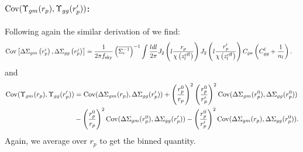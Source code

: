 \documentclass[onecolumn,amsmath,aps,fleqn, superscriptaddress]{revtex4}
\begin{document}
\paragraph*{${\rm Cov}(\Upsilon_{gm}(r_p),\Upsilon_{gg}(r_p^\prime))$:} Following again the similar derivation of \cite{Singh2016} we find:
\begin{align}
{\rm Cov}&\left[\Delta \Sigma_{gm}\left(r_p^i\right),\Delta \Sigma_{gg}\left(r_p^j\right) \right] = \frac{1}{2\pi f_{ \rm sky}}\left(\overline{\Sigma_c^{-1}}\right)^{-1} \int \frac{l dl}{2\pi} J_2\left(l\frac{r_p}{\chi\left(z_{{l}}^{\rm eff}\right)}\right) J_2\left(l\frac{r_p^\prime}{\chi\left(z_{{l}}^{\rm eff}\right)}\right) C_{g\kappa}\left(C_{gg}^l+\frac{1}{n_{l}}\right).
\label{DeltaSigma_gm_gg_cov}
\end{align}
and 
\begin{align}
{\rm Cov}(\Upsilon_{gm}(r_p),\Upsilon_{gg}(r_p^\prime)) &= {\rm Cov}(\Delta \Sigma_{gm}(r_p),\Delta \Sigma_{gg}(r_p^\prime)) + \left(\frac{r_p^0}{r_p}\right)^2 \left(\frac{r_p^0}{r_p^\prime}\right)^2 {\rm Cov}(\Delta \Sigma_{gm}(r_p^0),\Delta \Sigma_{gg}(r_p^0)) \nonumber \\ &-\left(\frac{r_p^0}{r_p}\right)^2  {\rm Cov}(\Delta \Sigma_{gm}(r_p^0),\Delta \Sigma_{gg}(r_p^\prime))-\left(\frac{r_p^0}{r_p^\prime}\right)^2  {\rm Cov}(\Delta \Sigma_{gm}(r_p),\Delta \Sigma_{gg}(r_p^0)).
\label{covupgggm}
\end{align}
Again, we average over $r_p$ to get the binned quantity.

\end{document}
